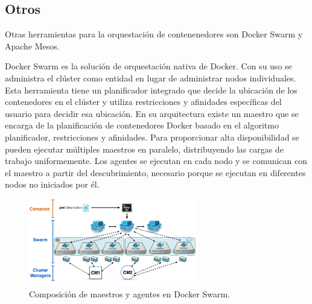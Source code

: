 
\subsection{Otros}

Otras herramientas para la orquestación de contenenedores son Docker Swarm y Apache Mesos.

Docker Swarm es la solución de orquestación nativa de Docker. Con su uso se administra el clúster como entidad en lugar de administrar nodos individuales. Esta herramienta tiene un planificador integrado que decide la ubicación de los contenedores en el clúster y utiliza restricciones y afinidades específicas del usuario para decidir esa ubicación. En su arquitectura existe un maestro que se encarga de la planificación de contenedores Docker basado en el algoritmo planificador, restricciones y afinidades. Para proporcionar alta disponibilidad se pueden ejecutar múltiples maestros en paralelo, distribuyendo las cargas de trabajo uniformemente. Los agentes se ejecutan en cada nodo y se comunican con el maestro a partir del descubrimiento, necesario porque se ejecutan en diferentes nodos no iniciados por él.

\begin{figure}[H]
\centering
\includegraphics[width=0.65\textwidth]{images/figures/dockermasterandagent.png}
\caption{Composición de maestros y agentes en Docker Swarm.\footnotemark}
\end{figure}

	
